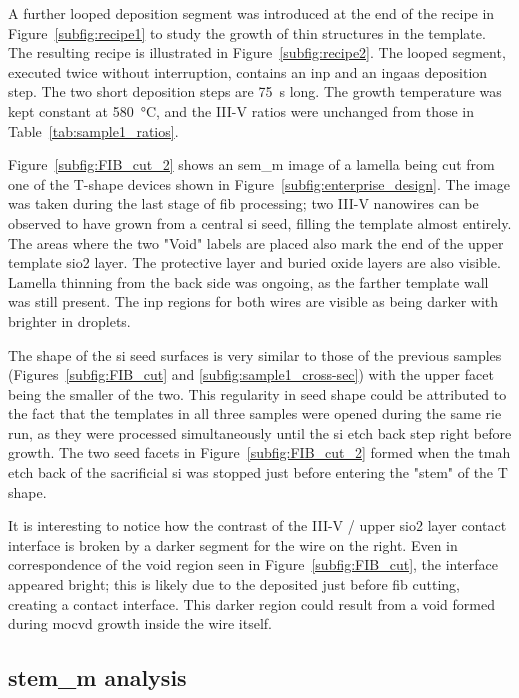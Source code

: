 A further looped deposition segment was introduced at the end of the recipe in Figure~\ref{subfig:recipe1} to study the growth of thin structures in the template. The resulting recipe is illustrated in Figure~\ref{subfig:recipe2}. The looped segment, executed twice without interruption, contains an \acs{inp} and an \acs{ingaas} deposition step. The two short deposition steps are \qty{75}{s} long. The growth temperature was kept constant at \qty{580}{\degreeCelsius}, and the III-V ratios were unchanged from those in Table~\ref{tab:sample1_ratios}.
\par
Figure~\ref{subfig:FIB_cut_2} shows an \acs{sem_m} image of a lamella being cut from one of the T-shape devices shown in Figure~\ref{subfig:enterprise_design}. The image was taken during the last stage of \acs{fib} processing; two III-V nanowires can be observed to have grown from a central \acs{si} seed, filling the template almost entirely. The areas where the two "Void" labels are placed also mark the end of the upper template \acs{sio2} layer. The protective  layer and buried oxide layers are also visible. Lamella thinning from the back side was ongoing, as the farther template wall was still present. The \acs{inp} regions for both wires are visible as being darker with brighter \acl{in} droplets.
\par
The shape of the \acs{si} seed surfaces is very similar to those of the previous samples (Figures~\ref{subfig:FIB_cut} and \ref{subfig:sample1_cross-sec}) with the upper  facet being the smaller of the two. This regularity in seed shape could be attributed to the fact that the templates in all three samples were opened during the same \acf{rie} run, as they were processed simultaneously until the \acs{si} etch back step right before growth. The two seed facets in Figure~\ref{subfig:FIB_cut_2} formed when the \acs{tmah} etch back of the sacrificial \acs{si} was stopped just before entering the "stem" of the T shape. 
\par
It is interesting to notice how the contrast of the III-V / upper \acs{sio2} layer contact interface is broken by a darker segment for the wire on the right. Even in correspondence of the void region seen in Figure~\ref{subfig:FIB_cut}, the interface appeared bright; this is likely due to the  deposited just before \acs{fib} cutting, creating a contact interface. This darker region could result from a void formed during \acs{mocvd} growth inside the wire itself.

\subsection{\texorpdfstring{\acs{stem_m} analysis}{STEM analysis}}

